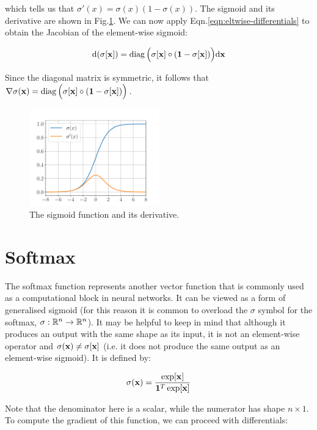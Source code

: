 which tells us that $\sigma'(x) = \sigma(x) (1 - \sigma(x))$.  The sigmoid and its derivative are shown in Fig.\ref{fig:sigmoid}.  We can now apply Eqn.\ref{eqn:eltwise-differentials} to obtain the Jacobian of the element-wise sigmoid:

\begin{align}
\operatorname{\text{d}} (\sigma[\mathbf{x}]) = \operatorname{diag}\Big(\sigma[\mathbf{x}]\circ(\mathbf{1} - \sigma[\mathbf{x}])\Big){\operatorname{\text{d}}} \mathbf{x}
\end{align}

Since the diagonal matrix is symmetric, it follows that $\nabla \sigma(\mathbf{x}) = \operatorname{diag}\Big(\sigma[\mathbf{x}]\circ(\mathbf{1} - \sigma[\mathbf{x}])\Big)$.

\begin{figure}
\centering
\includegraphics[width=0.5\textwidth]{figs/sigmoid.pdf}
\caption{The sigmoid function and its derivative.\label{fig:sigmoid}}  
\end{figure}

\section{Softmax} \label{sec:softmax}

The softmax function represents another vector function that is commonly used as a computational block in neural networks.  It can be viewed as a form of generalised sigmoid (for this reason it is common to overload the $\sigma$ symbol for the softmax, $\sigma : \mathbb{R}^n \to \mathbb{R}^n$).  It may be helpful to keep in mind that although it produces an output with the same shape as its input, it is not an element-wise operator and $\sigma(\mathbf{x}) \neq \sigma[\mathbf{x}]$ (i.e. it does not produce the same output as an element-wise sigmoid).  It is defined by:

\begin{align}
\sigma (\mathbf{x}) = \frac{\exp[\mathbf{x}]}{\mathbf{1}^T \exp[\mathbf{x}]} 
\end{align}

Note that the denominator here is a scalar, while the numerator has shape $n \times 1$.  To compute the gradient of this function, we can proceed with differentials:

